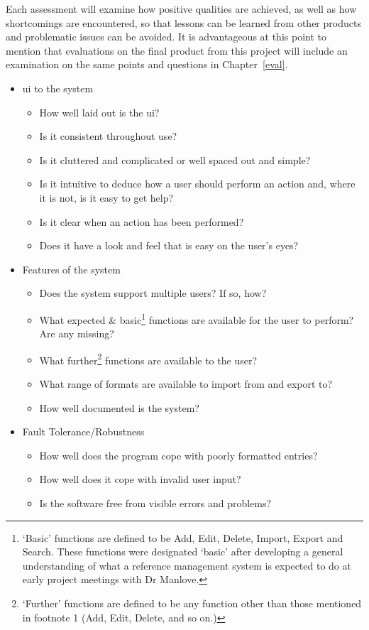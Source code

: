\documentclass{l4proj}
\begin{document}
Each assessment will examine how positive qualities are achieved, as well as how shortcomings are encountered, so that lessons can be learned from other products and problematic issues can be avoided.  It is advantageous at this point to mention that evaluations on the final product from this project will include an examination on the same points and questions in Chapter~\ref{eval}.
\begin{itemize}
	\item \gls{ui} to the system
	\begin{itemize}
		\item How well laid out is the \gls{ui}? 
		\item Is it consistent throughout use?
		\item Is it cluttered and complicated or well spaced out and simple?
		\item Is it intuitive to deduce how a user should perform an action and, where it is not, is it easy to get help?
		\item Is it clear when an action has been performed?
		\item Does it have a look and feel that is easy on the user's eyes?
	\end{itemize}
	\item Features of the system
	\begin{itemize}
		\item Does the system support multiple users? If so, how?
		\item What expected \& basic\footnote{`Basic' functions are defined to be Add, Edit, Delete, Import, Export and Search. These functions were designated `basic' after developing a general understanding of what a reference management system is expected to do at early project meetings with Dr Manlove.} functions are available for the user to perform? Are any missing?  %
		\item What further\footnote{`Further' functions are defined to be any function other than those mentioned in footnote 1 (Add, Edit, Delete, and so on.)} functions are available to the user? 
		\item What range of formats are available to import from and export to?
		\item How well documented is the system?
	\end{itemize}
	\item Fault Tolerance/Robustness
	\begin{itemize}	
		\item How well does the program cope with poorly formatted entries?
		\item How well does it cope with invalid user input?
		\item Is the software free from visible errors and problems?
	\end{itemize}
\end{itemize}
\end{document}
